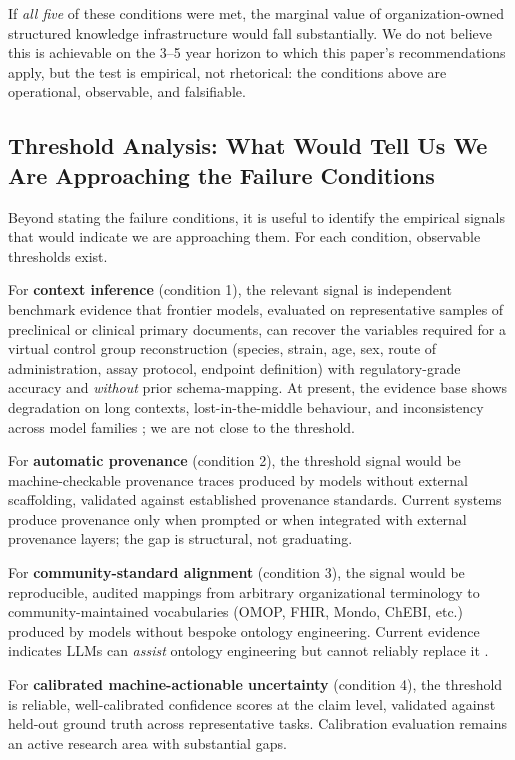 \documentclass[man,12pt,donotrepeattitle]{apa7}
\begin{document}
If \textit{all five} of these conditions were met, the marginal value of
organization-owned structured knowledge infrastructure would fall
substantially. We do not believe this is achievable on the 3--5 year horizon
to which this paper's recommendations apply, but the test is empirical, not
rhetorical: the conditions above are operational, observable, and falsifiable.

\subsection{Threshold Analysis: What Would Tell Us We Are Approaching the Failure Conditions}

Beyond stating the failure conditions, it is useful to identify the
empirical signals that would indicate we are approaching them. For each
condition, observable thresholds exist.

For \textbf{context inference} (condition 1), the relevant signal is
independent benchmark evidence that frontier models, evaluated on
representative samples of preclinical or clinical primary documents, can
recover the variables required for a virtual control group reconstruction
(species, strain, age, sex, route of administration, assay protocol,
endpoint definition) with regulatory-grade accuracy and \textit{without}
prior schema-mapping. At present, the evidence base shows degradation on
long contexts, lost-in-the-middle behaviour, and inconsistency across model
families \parencite{liu2024,leng2024}; we are not close to the threshold.

For \textbf{automatic provenance} (condition 2), the threshold signal would
be machine-checkable provenance traces produced by models without external
scaffolding, validated against established provenance standards. Current
systems produce provenance only when prompted or when integrated with
external provenance layers; the gap is structural, not graduating.

For \textbf{community-standard alignment} (condition 3), the signal would
be reproducible, audited mappings from arbitrary organizational terminology
to community-maintained vocabularies (OMOP, FHIR, Mondo, ChEBI, etc.)
produced by models without bespoke ontology engineering. Current evidence
indicates LLMs can \textit{assist} ontology engineering but cannot reliably
replace it \parencite{garciafernandez2025,garijo2025}.

For \textbf{calibrated machine-actionable uncertainty} (condition 4), the
threshold is reliable, well-calibrated confidence scores at the claim level,
validated against held-out ground truth across representative tasks.
Calibration evaluation remains an active research area with substantial gaps.
\end{document}
